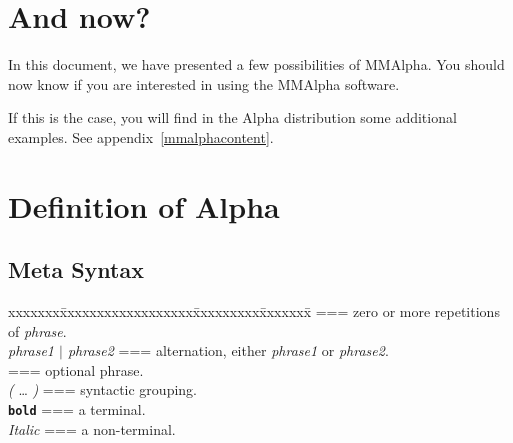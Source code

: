 \documentclass[12pt]{article}
\newcommand{\Alpha}{{\sc Alpha}}
\newcommand{\MMA}{{\sc MMAlpha}}
\newcommand{\alfa}{\Alpha}
\newcommand{\mmalfa}{\MMA}
\newcommand{\Group}[1]{{\rm\sl (} #1 {\rm\sl )}}
\newcommand{\Alt}{$\mid$}
\begin{document}
\section{And now?}
\label{andnow}
In this document, we have presented a few possibilities of 
\mmalfa{}. You should now know if you are interested in 
using the \mmalfa{} software. 

If this is the case, you will find in the \alfa{} distribution 
some additional examples. See appendix~\ref{mmalphacontent}.




\newpage
\appendix
\section{Definition of \Alpha}
\label{alpha1}

\subsection{Meta Syntax}
\begin{tabbing}
xxxxxxx\= xxxxxxxxxxxxxxxxxx\= xxxxxxxxx\= xxxxxxx\= \kill
{} \>===\>  zero or more repetitions of {\sl phrase}.\\
\> {\sl phrase1 {\sl \Alt} phrase2} \>===\> alternation, either {\sl
phrase1} or {\sl phrase2}.\\
\>  [\ldots] \>===\> optional phrase.\\
\> \Group{\ldots} \>===\> syntactic grouping.\\
\> {\bf \tt bold} \>===\> a terminal.\\
\> {\sl Italic} \>===\> a non-terminal.\\
\end{tabbing}
\end{document}
